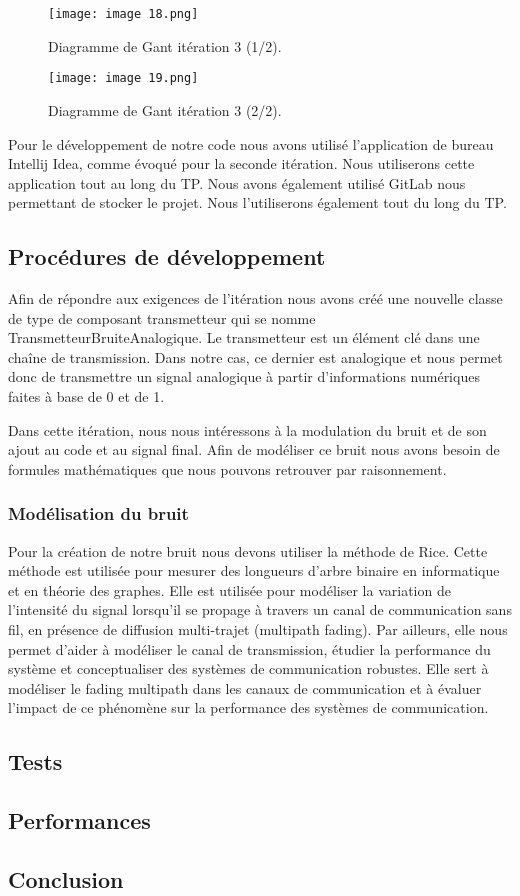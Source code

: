 \begin{figure}[h]
    \centering
    \texttt{[image: image 18.png]}
    \caption{\label{fig:image18}Diagramme de Gant itération 3 (1/2).}
\end{figure}
\begin{figure}[h]
    \centering
    \texttt{[image: image 19.png]}
    \caption{\label{fig:image19}Diagramme de Gant itération 3 (2/2).}
\end{figure}

Pour le développement de notre code nous avons utilisé l'application de bureau Intellij Idea, comme évoqué pour la seconde itération. Nous utiliserons cette application tout au long du TP. Nous avons également utilisé GitLab nous permettant de stocker le projet. Nous l'utiliserons également tout du long du TP.

\subsection{Procédures de développement}

Afin de répondre aux exigences de l'itération nous avons créé une nouvelle classe de type de composant transmetteur qui se nomme TransmetteurBruiteAnalogique. Le transmetteur est un élément clé dans une chaîne de transmission. Dans notre cas, ce dernier est analogique et nous permet donc de transmettre un signal analogique à partir d'informations numériques faites à base de 0 et de 1.

Dans cette itération, nous nous intéressons à la modulation du bruit et de son ajout au code et au signal final. Afin de modéliser ce bruit nous avons besoin de formules mathématiques que nous pouvons retrouver par raisonnement.

\subsubsection{Modélisation du bruit}
Pour la création de notre bruit nous devons utiliser la méthode de Rice. Cette méthode est utilisée pour mesurer des longueurs d'arbre binaire en informatique et en théorie des graphes. Elle est utilisée pour modéliser la variation de l'intensité du signal lorsqu'il se propage à travers un canal de communication sans fil, en présence de diffusion multi-trajet (multipath fading). Par ailleurs, elle nous permet d'aider à modéliser le canal de transmission, étudier la performance du système et conceptualiser des systèmes de communication robustes. Elle sert à modéliser le fading multipath dans les canaux de communication et à évaluer l'impact de ce phénomène sur la performance des systèmes de communication.

\subsection{Tests}

\subsection{Performances}

\subsection{Conclusion}